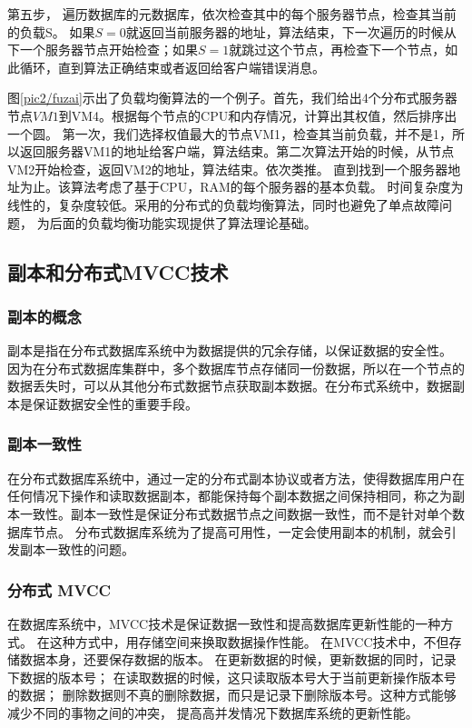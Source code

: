 第五步，
遍历数据库的元数据库，依次检查其中的每个服务器节点，检查其当前的负载S。
如果$ S=0 $就返回当前服务器的地址，算法结束，下一次遍历的时候从下一个服务器节点开始检查；如果$ S=1 $就跳过这个节点，再检查下一个节点，如此循环，直到算法正确结束或者返回给客户端错误消息。

图\ref{pic2/fuzai}示出了负载均衡算法的一个例子。首先，我们给出4个分布式服务器节点$ VM1 $到VM4。根据每个节点的CPU和内存情况，计算出其权值，然后排序出一个圆。
第一次，我们选择权值最大的节点VM1，检查其当前负载，并不是1，所以返回服务器VM1的地址给客户端，算法结束。第二次算法开始的时候，从节点VM2开始检查，返回VM2的地址，算法结束。依次类推。
直到找到一个服务器地址为止。该算法考虑了基于CPU，RAM的每个服务器的基本负载。
时间复杂度为线性的，复杂度较低。采用的分布式的负载均衡算法，同时也避免了单点故障问题，
为后面的负载均衡功能实现提供了算法理论基础。
\subsection{副本和分布式MVCC技术}
\subsubsection{副本的概念}
副本是指在分布式数据库系统中为数据提供的冗余存储，以保证数据的安全性。
因为在分布式数据库集群中，多个数据库节点存储同一份数据，所以在一个节点的数据丢失时，可以从其他分布式数据节点获取副本数据。在分布式系统中，数据副本是保证数据安全性的重要手段。
\subsubsection{副本一致性}
在分布式数据库系统中，通过一定的分布式副本协议或者方法，使得数据库用户在任何情况下操作和读取数据副本，都能保持每个副本数据之间保持相同，称之为副本一致性。副本一致性是保证分布式数据节点之间数据一致性，而不是针对单个数据库节点。
分布式数据库系统为了提高可用性，一定会使用副本的机制，就会引发副本一致性的问题。
\subsubsection{分布式 MVCC}
在数据库系统中，MVCC技术是保证数据一致性和提高数据库更新性能的一种方式。
在这种方式中，用存储空间来换取数据操作性能。
在MVCC技术中，不但存储数据本身，还要保存数据的版本。
在更新数据的时候，更新数据的同时，记录下数据的版本号；
在读取数据的时候，这只读取版本号大于当前更新操作版本号的数据；
删除数据则不真的删除数据，而只是记录下删除版本号。这种方式能够减少不同的事物之间的冲突，
提高高并发情况下数据库系统的更新性能。

